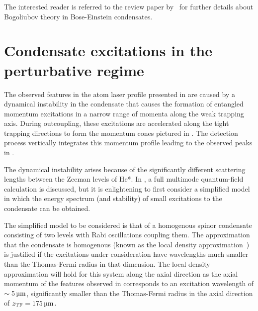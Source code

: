The interested reader is referred to the review paper by~\citet{Ozeri:2005} for further details about Bogoliubov theory in Bose-Einstein condensates.

\section{Condensate excitations in the perturbative regime}
\label{Peaks:PerturbativeApproach}

The observed features in the atom laser profile presented in  are caused by a dynamical instability in the condensate that causes the formation of entangled momentum excitations in a narrow range of momenta along the weak trapping axis. During outcoupling, these excitations are accelerated along the tight trapping directions to form the momentum cones pictured in . The detection process vertically integrates this momentum profile leading to the observed peaks in .

The dynamical instability arises because of the significantly different scattering lengths between the Zeeman levels of He*. In , a full multimode quantum-field calculation is discussed, but it is enlightening to first consider a simplified model in which the energy spectrum (and stability) of small excitations to the condensate can be obtained.

The simplified model to be considered is that of a homogenous spinor condensate consisting of two levels with Rabi oscillations coupling them. The approximation that the condensate is homogenous (known as the local density approximation~\cite{Stamper-Kurn:1999,Zambelli:2000}) is justified if the excitations under consideration have wavelengths much smaller than the Thomas-Fermi radius in that dimension. The local density approximation will hold for this system along the axial direction as the axial momentum of the features observed in  corresponds to an excitation wavelength of $\sim \unit[5]{\micro m}$, significantly smaller than the Thomas-Fermi radius in the axial direction of $z_\text{TF} = \unit[175]{\micro m}$. 

